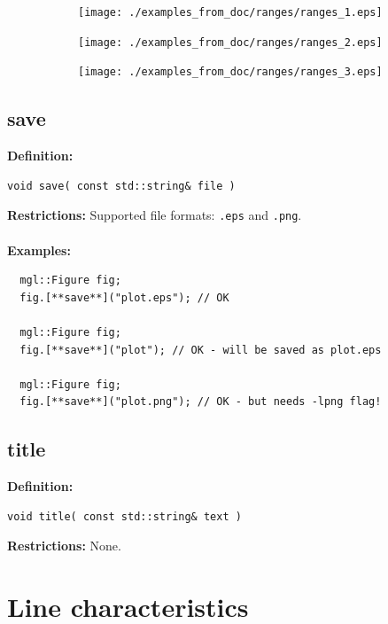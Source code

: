 \documentclass[a4paper]{article}
\newcommand{\command}[1]{\subsection{#1}}
\begin{document}
\begin{figure}
  \centering
  \begin{subfigure}[hb]{0.32\linewidth}
    \texttt{[image: ./examples\_from\_doc/ranges/ranges\_1.eps]}
  \end{subfigure}
  \hfill
  \begin{subfigure}[hb]{0.32\linewidth}
    \texttt{[image: ./examples\_from\_doc/ranges/ranges\_2.eps]}
  \end{subfigure}
  \hfill
  \begin{subfigure}[hb]{0.32\linewidth}
    \texttt{[image: ./examples\_from\_doc/ranges/ranges\_3.eps]}
  \end{subfigure}
\end{figure}

\command{save}

\textbf{Definition:}
\begin{lstlisting}
void save( const std::string& file )
\end{lstlisting}
%
\textbf{Restrictions:} Supported file formats: \texttt{.eps} and \texttt{.png}. \\ \\
%
\textbf{Examples:}
\begin{lstlisting}
  mgl::Figure fig;
  fig.[**save**]("plot.eps"); // OK

  mgl::Figure fig;
  fig.[**save**]("plot"); // OK - will be saved as plot.eps

  mgl::Figure fig;
  fig.[**save**]("plot.png"); // OK - but needs -lpng flag!
\end{lstlisting}

\command{title}

\textbf{Definition:}
\begin{lstlisting}
void title( const std::string& text )
\end{lstlisting}
%
\textbf{Restrictions:} None.

\section{Line characteristics}
\end{document}
